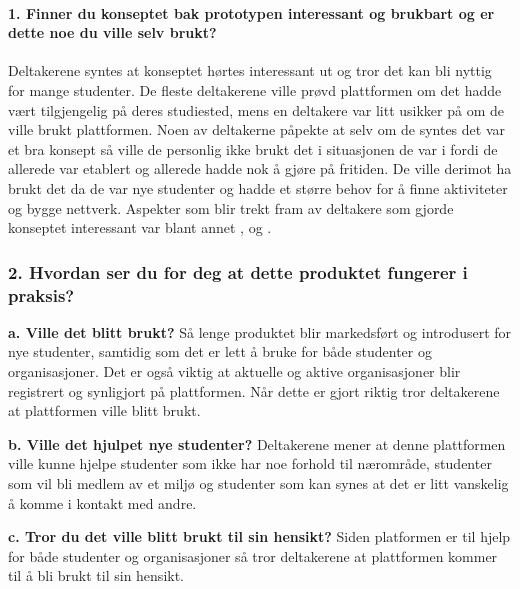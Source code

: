 \paragraph{1. Finner du konseptet bak prototypen interessant og brukbart og er dette noe du ville selv brukt?}
Deltakerene syntes at konseptet hørtes interessant ut og tror det kan bli nyttig for mange studenter. De fleste deltakerene ville prøvd plattformen om det hadde vært tilgjengelig på deres studiested, mens en deltakere var litt usikker på om de ville brukt plattformen. Noen av deltakerne påpekte at selv om de syntes det var et bra konsept så ville de personlig ikke brukt det i situasjonen de var i fordi de allerede var etablert og allerede hadde nok å gjøre på fritiden. De ville derimot ha brukt det da de var nye studenter og hadde et større behov for å finne aktiviteter og bygge nettverk. Aspekter som blir trekt fram av deltakere som gjorde konseptet interessant var blant annet ,  og .

\subsubsection{2. Hvordan ser du for deg at dette produktet fungerer i praksis?}
{\bf a. Ville det blitt brukt?}
Så lenge produktet blir markedsført og introdusert for nye studenter, samtidig som det er lett å bruke for både studenter og organisasjoner. Det er også viktig at aktuelle og aktive organisasjoner blir registrert og synligjort på plattformen. Når dette er gjort riktig tror deltakerene at plattformen ville blitt brukt. 

{\bf b. Ville det hjulpet nye studenter?}
Deltakerene mener at denne plattformen ville kunne hjelpe studenter som ikke har noe forhold til nærområde, studenter som vil bli medlem av et miljø og studenter som kan synes at det er litt vanskelig å komme i kontakt med andre.

{\bf c. Tror du det ville blitt brukt til sin hensikt?}
Siden platformen er til hjelp for både studenter og organisasjoner så tror deltakerene at plattformen kommer til å bli brukt til sin hensikt.

